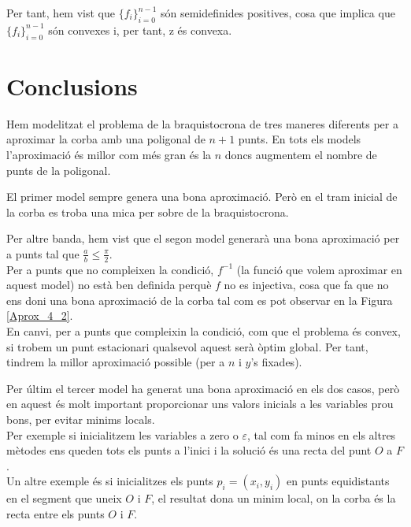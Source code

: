 \documentclass[10pt]{extarticle}
\begin{document}
Per tant, hem vist que $\{f_i\}_{i=0}^{n-1}$ són semidefinides positives, cosa que implica que $\{f_i\}_{i=0}^{n-1}$ són convexes i, per tant, z és convexa.

\section{Conclusions}
Hem modelitzat el problema de la braquistocrona de tres maneres diferents per a aproximar la corba amb una poligonal de $n+1$ punts. En tots els models l'aproximació és millor com més gran és la $n$ doncs augmentem el nombre de punts de la poligonal. \vspace{.25cm}

El primer model sempre genera una bona aproximació. Però en el tram inicial de la corba es troba una mica per sobre de la braquistocrona. \vspace{.25cm}

Per altre banda, hem vist que el segon model generarà una bona aproximació per a punts tal que $\frac{a}{b} \le \frac{\pi}{2}$. \\
Per a punts que no compleixen la condició, $f^{-1}$ (la funció que volem aproximar en aquest model) no està ben definida perquè $f$ no es injectiva, cosa que fa que no ens doni una bona aproximació de la corba tal com es pot observar en la Figura \ref{Aprox_4_2}. \\
En canvi, per a punts que compleixin la condició, com que el problema és convex, si trobem un punt estacionari qualsevol aquest serà òptim global. Per tant, tindrem la millor aproximació possible (per a $n$ i $y$'s fixades). \vspace{.25cm}

Per últim el tercer model ha generat una bona aproximació en els dos casos, però en aquest és molt important proporcionar uns valors inicials a les variables prou bons, per evitar minims locals. \\
Per exemple si inicialitzem les variables a zero o $\varepsilon$, tal com fa minos en els altres mètodes ens queden tots els punts a l'inici i la solució és una recta del punt $O$ a $F$. \\
Un altre exemple és si inicialitzes els punts $p_i = (x_i, y_i)$ en punts equidistants en el segment que uneix $O$ i $F$, el resultat dona un minim local, on la corba és la recta entre els punts $O$ i $F$.
\end{document}
